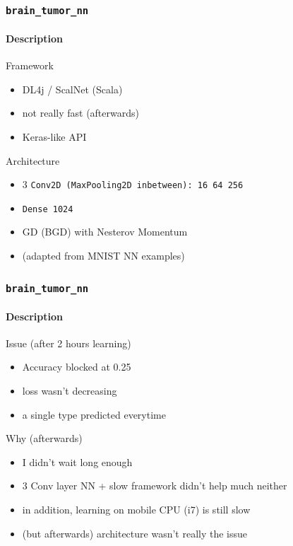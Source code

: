 \documentclass[]{beamer}
\newcommand{\btn}{\tt{brain\_tumor\_nn}}
\begin{document}
\begin{frame}
  \frametitle{\btn}
  \framesubtitle{Description}
  \begin{block}{Framework}
    \begin{itemize}
      \item DL4j / ScalNet (Scala)
      \item not really fast (afterwards)
      \item Keras-like API
    \end{itemize}
  \end{block}
  \begin{exampleblock}{Architecture}
    \begin{itemize}
      \item 3 \tt{Conv2D} (\tt{MaxPooling2D} inbetween): 16 64 256
      \item \tt{Dense} 1024
      \item GD (BGD) with Nesterov Momentum
      \item (adapted from MNIST NN examples)
    \end{itemize}
  \end{exampleblock}
\end{frame}

\begin{frame}
  \frametitle{\btn}
  \framesubtitle{Description}
  \begin{block}{Issue (after 2 hours learning)}
    \begin{itemize}
      \item Accuracy blocked at 0.25
      \item loss wasn't decreasing
      \item a \alert{single type} predicted everytime
    \end{itemize}
  \end{block}
  \begin{exampleblock}{Why (afterwards)}
    \begin{itemize}
      \item I didn't wait long enough
      \item 3 Conv layer NN + slow framework didn't help much neither
      \item in addition, learning on mobile CPU (i7) is still slow
      \item (but afterwards) architecture wasn't really the issue
    \end{itemize}
  \end{exampleblock}
\end{frame}





\begin{frame}
  \frametitle{}
  \framesubtitle{}
\end{frame}
\end{document}
